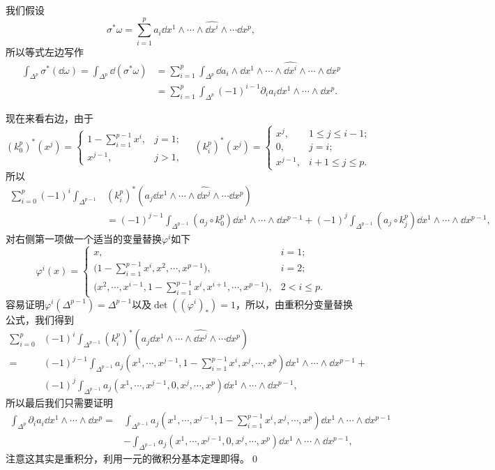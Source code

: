 我们假设
\[
	\sigma^*\omega=\sum_{i=1}^pa_i\dd x^1\wedge\cdots\wedge\widehat{\dd x^i}\wedge\cdots \dd x^p,
\]
所以等式左边写作
\[
\begin{aligned}
	\int_{\Delta^p} \sigma^*(\dd \omega)=\int_{\Delta^p} \dd(\sigma^* \omega)&=\sum_{i=1}^p\int_{\Delta^{p}} \dd a_i\wedge \dd x^1\wedge\cdots\wedge\widehat{\dd x^i}\wedge\cdots\wedge\dd x^p\\
	&=\sum_{i=1}^p\int_{\Delta^{p}} (-1)^{i-1}\partial_i a_i\dd x^1\wedge\cdots \wedge\dd x^p.
\end{aligned}
\]

现在来看右边，由于
\[(k^p_0)^*(x^j)=
\begin{cases}
	1-\sum_{i=1}^{p-1}x^i,& j =1;\\
	x^{j-1},& j>1,
\end{cases}\quad
(k^p_i)^*(x^j)=
\begin{cases}
	x^j,& 1\leq j \leq i-1;\\
	0,& j=i;\\
	x^{j-1},& i+1\leq j \leq p.
\end{cases}
\]
所以
\[
\begin{aligned}
	\sum_{i=0}^p(-1)^i\int_{\Delta^{p-1}}& (k^p_i)^*(a_j\dd x^1\wedge\cdots\wedge\widehat{\dd x^j}\wedge\cdots \dd x^p)\\
	&=(-1)^{j-1}\int_{\Delta^{p-1}} (a_j\circ k^p_0)\dd x^1\wedge\cdots \wedge\dd x^{p-1}+(-1)^j\int_{\Delta^{p-1}} (a_j\circ k_j^p)\dd x^1\wedge\cdots \wedge\dd x^{p-1},
\end{aligned}
\]
对右侧第一项做一个适当的变量替换$\varphi^i$如下
\[
	\varphi^i(x)=\begin{cases}
		x,& i=1;\\
		\bigl(1-\sum_{i=1}^{p-1}x^i,x^2,\cdots,x^{p-1}\bigr),& i=2;\\
		\bigl(x^2,\cdots,x^{i-1},1-\sum_{i=1}^{p-1}x^i,x^{i+1},\cdots,x^{p-1}\bigr),& 2<i\leq p.
	\end{cases}
\]
容易证明$\varphi^i(\Delta^{p-1})=\Delta^{p-1}$以及$\det ((\varphi^i)_*)=1$，所以，由重积分变量替换公式，我们得到
\[
\begin{aligned}
	\sum_{i=0}^p&(-1)^i\int_{\Delta^{p-1}} (k^p_i)^*(a_j\dd x^1\wedge\cdots\wedge\widehat{\dd x^j}\wedge\cdots \dd x^p)\\
	=&(-1)^{j-1}\int_{\Delta^{p-1}} a_j\left(x^1,\cdots,x^{j-1},1-\sum_{i=1}^{p-1}x^i,x^{j},\cdots,x^p\right)\dd x^1\wedge\cdots \wedge\dd x^{p-1}+\\
	&(-1)^{j}\int_{\Delta^{p-1}}a_j(x^1,\cdots,x^{j-1},0,x^{j},\cdots,x^p)\dd x^1\wedge\cdots \wedge\dd x^{p-1},
\end{aligned}
\]
所以最后我们只需要证明
\[
\begin{aligned}
	\int_{\Delta^{p}}\partial_i a_i\dd x^1\wedge\cdots \wedge\dd x^p=
	&\int_{\Delta^{p-1}} a_j\left(x^1,\cdots,x^{j-1},1-\sum_{i=1}^{p-1}x^i,x^{j},\cdots,x^p\right)\dd x^1\wedge\cdots \wedge\dd x^{p-1}\\
	&-\int_{\Delta^{p-1}}a_j(x^1,\cdots,x^{j-1},0,x^{j},\cdots,x^p)\dd x^1\wedge\cdots \wedge\dd x^{p-1},
\end{aligned}
\]
注意这其实是重积分，利用一元的微积分基本定理即得。\qed

